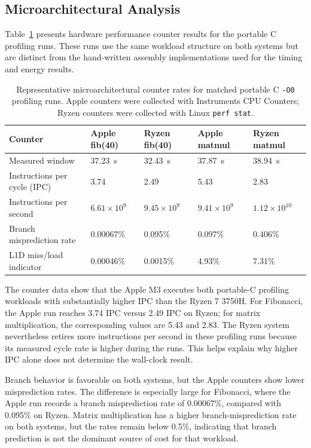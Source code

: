 \documentclass{tcsa}
\begin{document}
\subsection{Microarchitectural Analysis}
\label{sec:uarch}

Table~\ref{tab:uarch} presents hardware performance counter results for
the portable C profiling runs. These runs use the same workload
structure on both systems but are distinct from the hand-written
assembly implementations used for the timing and energy results.

\begin{table}[!ht]
\centering
\small
\caption{Representative microarchitectural counter rates for matched portable C \texttt{-O0} profiling runs. Apple counters were collected with Instruments CPU Counters; Ryzen counters were collected with Linux \texttt{perf stat}.}
\label{tab:uarch}
\begin{tabularx}{\textwidth}{lXXXX}
\toprule
Counter & Apple fib(40) & Ryzen fib(40) & Apple matmul & Ryzen matmul \\
\midrule
Measured window              & 37.23~s & 32.43~s & 37.87~s & 38.94~s \\
Instructions per cycle (IPC) & 3.74 & 2.49 & 5.43 & 2.83 \\
Instructions per second      & $6.61 \times 10^9$ & $9.45 \times 10^9$ & $9.41 \times 10^9$ & $1.12 \times 10^{10}$ \\
Branch misprediction rate    & 0.00067\% & 0.095\% & 0.097\% & 0.406\% \\
L1D miss/load indicator      & 0.00046\% & 0.0015\% & 4.93\% & 7.31\% \\
\bottomrule
\end{tabularx}
\end{table}

The counter data show that the Apple M3 executes both portable-C
profiling workloads with substantially higher IPC than the Ryzen 7
3750H. For Fibonacci, the Apple run reaches 3.74 IPC versus 2.49 IPC on
Ryzen; for matrix multiplication, the corresponding values are 5.43 and
2.83. The Ryzen system nevertheless retires more instructions per
second in these profiling runs because its measured cycle rate is
higher during the runs. This helps explain why higher IPC alone does
not determine the wall-clock result.

Branch behavior is favorable on both systems, but the Apple counters
show lower misprediction rates. The difference is especially large for
Fibonacci, where the Apple run records a branch misprediction rate of
0.00067\%, compared with 0.095\% on Ryzen. Matrix multiplication has a
higher branch-misprediction rate on both systems, but the rates remain
below 0.5\%, indicating that branch prediction is not the dominant
source of cost for that workload.
\end{document}
